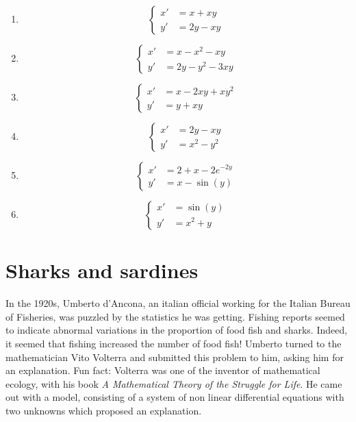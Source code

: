 \begin{enumerate}
\item \[\left\{\begin{split} x' & = x+xy \\ y' & = 2y -xy \end{split}\right.\]
\item \[\left\{\begin{split} x' & = x-x^2-xy \\ y' & = 2y-y^2-3xy \end{split}\right.\]
\item \[\left\{\begin{split} x' & = x-2xy+xy^2 \\ y' & = y+xy \end{split}\right.\]
\item \[\left\{\begin{split} x' & = 2y-xy \\ y' & = x^2-y^2 \end{split}\right.\]
\item \[\left\{\begin{split} x' & = 2+x-2e^{-2y} \\ y' & = x - \sin (y) \end{split}\right.\]
\item \[\left\{\begin{split} x' & = \sin (y) \\ y' & = x^2 +y \end{split}\right.\]

\end{enumerate}

\section{Sharks and sardines}

In the 1920s, Umberto d'Ancona, an italian official working for the Italian Bureau of Fisheries, was puzzled by the statistics he was getting. Fishing reports seemed to indicate abnormal variations in the proportion of food fish and sharks. Indeed, it seemed that fishing increased the number of food fish! Umberto turned to the mathematician Vito Volterra and submitted this problem to him, asking him for an explanation. Fun fact: Volterra was one of the inventor of mathematical ecology, with his book \textit{A Mathematical Theory of the Struggle for Life}. He came out with a model, consisting of a system of non linear differential equations with two unknowns which proposed an explanation.\\     

